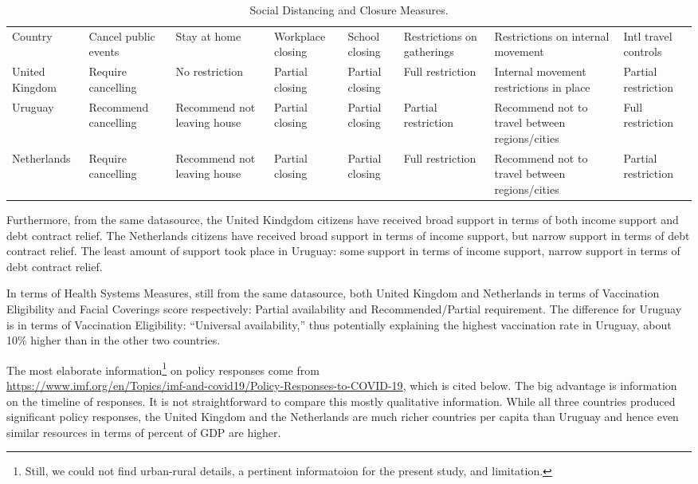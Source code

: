 \documentclass[10pt, letterpaper]{article}
\begin{document}
\begin{spacing}{1.4}
\begin{table}[H]
  \centering
  \begin{tabular}{p{2cm}p{2cm}p{2cm}p{2cm}p{2cm}p{2cm}p{2cm}p{2cm}}
    Country&Cancel public events&Stay at home&Workplace closing&School closing&Restrictions on gatherings&Restrictions on internal movement&Intl travel controls\\
    United Kingdom&Require cancelling&No restriction&Partial closing&Partial closing&Full restriction&Internal movement restrictions in place&Partial restriction\\
    Uruguay&Recommend cancelling&Recommend not leaving house&Partial closing&Partial closing&Partial restriction&Recommend not to travel between regions/cities&Full restriction\\
Netherlands&Require cancelling&Recommend not leaving house&Partial closing&Partial closing&Full restriction&Recommend not to travel between regions/cities&Partial restriction\\
  \end{tabular}
  \caption{Social Distancing and Closure Measures.}
\end{table}

Furthermore, from the same datasource, the United Kindgdom citizens have received broad support in terms
of both income support and debt contract relief. The Netherlands citizens have received broad support in terms
of income support, but narrow support in terms of debt contract relief. The
least amount of support took place in Uruguay: some support in terms
of income support, narrow support in terms of debt contract relief.

In terms of  Health Systems Measures, still from the same datasource, both
United Kingdom and Netherlands in terms of Vaccination Eligibility and 	Facial
Coverings score respectively: Partial availability and Recommended/Partial requirement.
 The difference for Uruguay is in terms of Vaccination Eligibility: ``Universal
 availability,'' thus potentially explaining the highest vaccination rate in
 Uruguay, about 10\% higher than in the other two countries. 	

The most elaborate information\footnote{Still, we could not find urban-rural
  details, a pertinent informatoion for the present study, and limitation.} on policy responses come from\\
\url{https://www.imf.org/en/Topics/imf-and-covid19/Policy-Responses-to-COVID-19},
which is cited below. The big advantage is information on the timeline of
responses. It is not straightforward to compare this mostly qualitative
information. While all three countries produced significant policy responses,
the United Kingdom and the Netherlands are much richer countries per capita than Uruguay
and hence even similar resources in terms of percent of GDP are higher.\\



\end{spacing}
\end{document}
